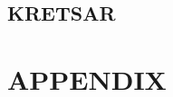 \documentclass[a4paper,twoside,twocolumn,openright]{book}
\begin{document}
\chapter{KRETSAR}

\cleardoublepage

\cleardoublepage

\cleardoublepage

\cleardoublepage

\cleardoublepage

\cleardoublepage

\cleardoublepage

\cleardoublepage


%
%
%
%
%
%
%

%

%
%
%

\appendix
\part{APPENDIX}

%

%
%
%
%
%
%
%
%


\listoffigures
\listoftables

\backmatter

\printindex
\end{document}
